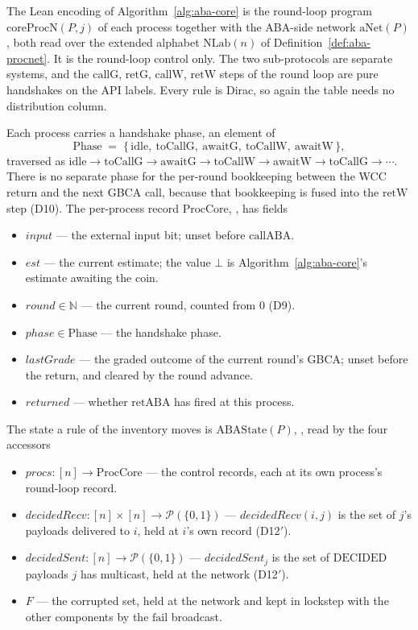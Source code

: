 The Lean encoding of Algorithm~\ref{alg:aba-core} is the round-loop program
$\mathrm{coreProcN}(P,j)$ of each process together with the ABA-side network
$\mathrm{aNet}(P)$, both read over the extended alphabet $\mathrm{NLab}(n)$ of
Definition~\ref{def:aba-procnet}.
It is the round-loop control only.
The two sub-protocols are separate systems, and the $\mathrm{callG}$,
$\mathrm{retG}$, $\mathrm{callW}$, $\mathrm{retW}$ steps of the round loop are
pure handshakes on the API labels.
Every rule is Dirac, so again the table needs no distribution column.

Each process carries a handshake phase, an element of
\[
  \mathrm{Phase} \;=\;
  \{\,\mathrm{idle},\ \mathrm{toCallG},\ \mathrm{awaitG},\ \mathrm{toCallW},\
    \mathrm{awaitW}\,\},
\]
traversed as
$\mathrm{idle} \to \mathrm{toCallG} \to \mathrm{awaitG} \to \mathrm{toCallW}
\to \mathrm{awaitW} \to \mathrm{toCallG} \to \cdots$.
There is no separate phase for the per-round bookkeeping between the WCC return
and the next GBCA call, because that bookkeeping is fused into the
$\mathrm{retW}$ step (D10).
The per-process record $\mathrm{ProcCore}$, , has fields
\begin{itemize}
  \item $\mathit{input}$ --- the external input bit; unset before
    $\mathrm{callABA}$.
  \item $\mathit{est}$ --- the current estimate; the value $\bot$ is
    Algorithm~\ref{alg:aba-core}'s estimate awaiting the coin.
  \item $\mathit{round} \in \mathbb{N}$ --- the current round, counted from $0$
    (D9).
  \item $\mathit{phase} \in \mathrm{Phase}$ --- the handshake phase.
  \item $\mathit{lastGrade}$ --- the graded outcome of the current round's GBCA;
    unset before the return, and cleared by the round advance.
  \item $\mathit{returned}$ --- whether $\mathrm{retABA}$ has fired at this
    process.
\end{itemize}
The state a rule of the inventory moves is $\mathrm{ABAState}(P)$,
\leandecl{PLTS.ABA.ABAState}, read by the four accessors
\begin{itemize}
  \item $\mathit{procs} : [n] \to \mathrm{ProcCore}$ --- the control records,
    each at its own process's round-loop record.
  \item $\mathit{decidedRecv} : [n] \times [n] \to \mathcal{P}(\{0,1\})$ ---
    $\mathit{decidedRecv}(i,j)$ is the set of $j$'s payloads delivered to $i$,
    held at $i$'s own record (D12$'$).
  \item $\mathit{decidedSent} : [n] \to \mathcal{P}(\{0,1\})$ ---
    $\mathit{decidedSent}_j$ is the set of $\mathrm{DECIDED}$ payloads $j$ has
    multicast, held at the network (D12$'$).
  \item $F$ --- the corrupted set, held at the network and kept in lockstep
    with the other components by the $\mathrm{fail}$ broadcast.
\end{itemize}
